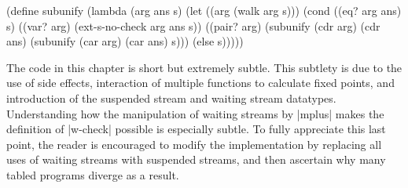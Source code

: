 \schemedisplayspace
\begin{schemedisplay}
(define subunify
  (lambda (arg ans s)
    (let ((arg (walk arg s)))
      (cond
        ((eq? arg ans) s)
        ((var? arg) (ext-s-no-check arg ans s))
        ((pair? arg) (subunify (cdr arg) (cdr ans)
                       (subunify (car arg) (car ans) s)))
        (else s)))))
\end{schemedisplay}

The code in this chapter is short but extremely subtle.  This subtlety
is due to the use of side effects, interaction of multiple functions
to calculate fixed points, and introduction of the suspended stream
and waiting stream datatypes.  Understanding how the manipulation of
waiting streams by \scheme|mplus| makes the definition of
\scheme|w-check| possible is especially subtle.  To fully appreciate
this last point, the reader is encouraged to modify the implementation
by replacing all uses of waiting streams with suspended streams, and
then ascertain why many tabled programs diverge as a result.
